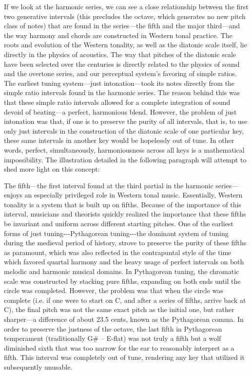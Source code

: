 If we look at the harmonic series, we can see a close relationship
between the first two generative intervals (this precludes the octave,
which generates no new pitch class of notes) that are found in the
series---the fifth and the major third---and the way harmony and chords
are constructed in Western tonal practice. The roots and evolution of
the Western tonality, as well as the diatonic scale itself, lie directly
in the physics of acoustics. The way that pitches of the diatonic scale
have been selected over the centuries is directly related to the physics
of sound and the overtone series, and our perceptual system's favoring
of simple ratios. The earliest tuning system---just intonation---took
its notes directly from the simple ratio intervals found in the harmonic
series. The reason behind this was that these simple ratio intervals
allowed for a complete integration of sound devoid of beating---a
perfect, harmonious blend. However, the problem of just intonation was
that, if one is to preserve the purity of all intervals, that is, to use
only just intervals in the construction of the diatonic scale of one
particular key, these same intervals in another key would be hopelessly
out of tune. In other words, perfect, simultaneously, harmoniousness
across all keys is a mathematical impossibility. The illustration
detailed in the following paragraph will attempt to shed more light on
this concept:

The fifth---the first interval found at the third partial in the
harmonic series---enjoys an especially privileged role in Western tonal
music. Essentially, Western tonality is a system that is built up on
fifths. Because of the importance of this interval, musicians and
theorists quickly realized the importance that these fifths be invariant
and uniform across different starting pitches. One of the earliest forms
of just tuning-\/-\/-Pythagorean tuning-\/-\/-the dominant system of
tuning during the medieval period of history, strove to preserve the
purity of these fifths as paramount, which was also reflected in the
contrapuntal style of the time which favored quartal harmony and the
heavy usage of perfect intervals on both melodic and harmonic musical
domains. In Pythagorean tuning, the chromatic scale was constructed by
stacking pure fifths, expanding on both ends until the circle was
completed. However, the problem was that when the circle was complete
(i.e. if one were to start on C, and after a series of fifths, arrive
back at C), the final pitch was not the same exact pitch as the initial
one, but rather sharper---a difference of about 23.5 cents, known as the
Pythagorean comma. In order to preserve the justness of the octave, the
last fifth in Pythagorean temperament (traditionally G\# -- E-flat) was
not truly a fifth but a wolf diminished sixth that was too narrow for
the ear to reasonably interpret as a fifth. This interval was completely
out of tune, rendering any key that utilized it subsequently unusable.

